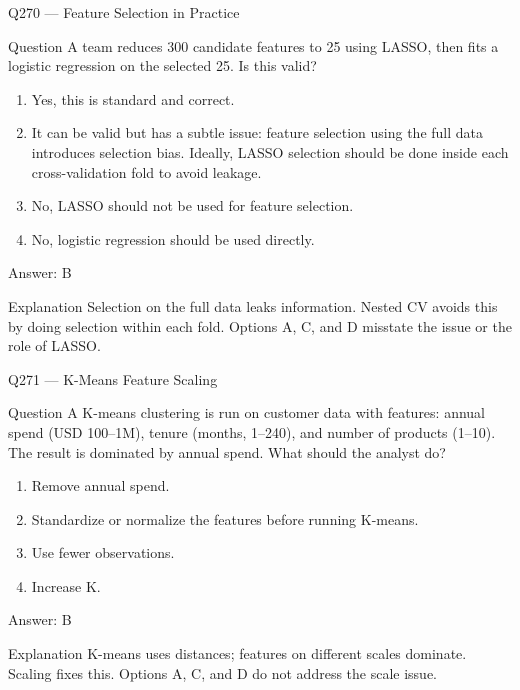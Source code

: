 \documentclass[aspectratio=169,8pt]{beamer}
\begin{document}
\begin{frame}{Q270 --- Feature Selection in Practice}
\begin{block}{Question}
A team reduces 300 candidate features to 25 using LASSO, then fits a logistic regression on the selected 25. Is this valid?
\begin{enumerate}
\item Yes, this is standard and correct.
\item It can be valid but has a subtle issue: feature selection using the full data introduces selection bias. Ideally, LASSO selection should be done inside each cross-validation fold to avoid leakage.
\item No, LASSO should not be used for feature selection.
\item No, logistic regression should be used directly.
\end{enumerate} \end{block}
\begin{exampleblock}{Answer: B}\end{exampleblock}
\begin{block}{Explanation}
Selection on the full data leaks information. Nested CV avoids this by doing selection within each fold. Options A, C, and D misstate the issue or the role of LASSO.
\end{block}
\end{frame}


\begin{frame}{Q271 --- K-Means Feature Scaling}
\begin{block}{Question}
A K-means clustering is run on customer data with features: annual spend (USD 100--1M), tenure (months, 1--240), and number of products (1--10). The result is dominated by annual spend. What should the analyst do?
\end{block}
\begin{enumerate}
\item Remove annual spend.
\item Standardize or normalize the features before running K-means.
\item Use fewer observations.
\item Increase K.
\end{enumerate}
\begin{exampleblock}{Answer: B}\end{exampleblock}
\begin{block}{Explanation}
K-means uses distances; features on different scales dominate. Scaling fixes this. Options A, C, and D do not address the scale issue.
\end{block}
\end{frame}
\end{document}
